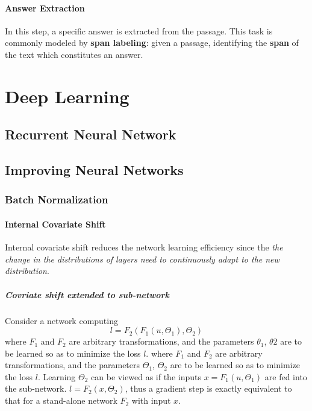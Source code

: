 \documentclass[a4paper, 12pt]{book} %
\begin{document}
\subsection{Answer Extraction}
In this step, a specific answer is extracted from the passage. This task is commonly modeled by \textbf{span labeling}: given a passage, identifying the \textbf{span} of the text which constitutes an answer.


\part{Deep Learning}

\chapter{Recurrent Neural Network}

\chapter{Improving Neural Networks}
\section{Batch Normalization}
\subsection{Internal Covariate Shift}
Internal covariate shift reduces the network learning efficiency since the \emph{the change in the distributions of layers need to continuously adapt to the new distribution}.

\subsubsection{Covriate shift extended to sub-network}
Consider a network computing 
$$l=F_2{(F_1{(u,\Theta_1)},\Theta_2)}$$
where $F_1$ and $F_2$ are arbitrary transformations, and the
parameters $\theta_1$, $\theta2$ are to be learned so as to minimize
the loss $l$.
where $F_1$ and $F_2$ are arbitrary transformations, and the parameters $\Theta_1$, $\Theta_2$ are to be learned so as to minimize the loss $l$. Learning $\Theta_2$ can be viewed as if the inputs $x=F_1{(u,\Theta_1)}$ are fed into the sub-network. $l=F_2{(x, \Theta_2)}$, thus a gradient step is exactly equivalent to that for a stand-alone network $F_2$ with input $x$. 
\end{document}
